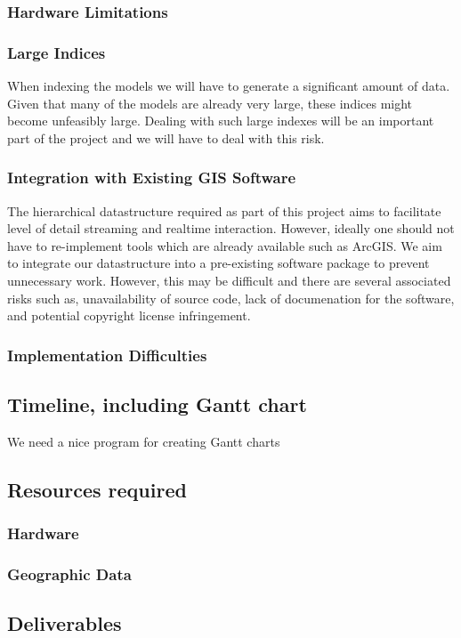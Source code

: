 \documentclass[12pt,a4paper]{article}
\begin{document}
\subsubsection*{Hardware Limitations}
\subsubsection*{Large Indices}
When indexing the models we will have to generate a significant amount of data. Given that many of the models are already very large, these indices might become unfeasibly large. Dealing with such large indexes will be an important part of the project and we will have to deal with this risk.
\subsubsection*{Integration with Existing GIS Software}
The hierarchical datastructure required as part of this project aims to facilitate level of detail streaming and realtime interaction. However, ideally one should not have to re-implement tools which are already available such as ArcGIS. We aim to integrate our datastructure into a pre-existing software package to prevent unnecessary work. However, this may be difficult and there are several associated risks such as, unavailability of source code, lack of documenation for the software, and potential copyright license infringement.
\subsubsection*{Implementation Difficulties}
\subsection{Timeline, including Gantt chart}
We need a nice program for creating Gantt charts
\subsection{Resources required}
\subsubsection*{Hardware}
\subsubsection*{Geographic Data}
\subsection{Deliverables}
\end{document}
